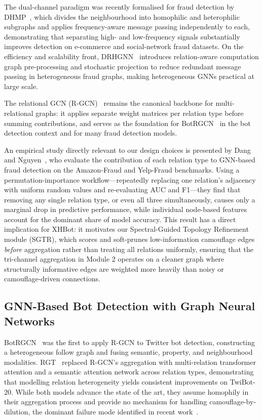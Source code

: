 The dual-channel paradigm was recently formalised for fraud detection by
DHMP~\cite{zhang2025dhmp}, which divides the neighbourhood into homophilic and
heterophilic subgraphs and applies frequency-aware message passing independently to
each, demonstrating that separating high- and low-frequency signals substantially
improves detection on e-commerce and social-network fraud datasets.
On the efficiency and scalability front, DRHGNN~\cite{li2025drhgnn} introduces
relation-aware computation graph pre-processing and stochastic projection to reduce
redundant message passing in heterogeneous fraud graphs, making heterogeneous GNNs
practical at large scale.

The relational GCN (R-GCN)~\cite{schlichtkrull2018rgcn} remains the canonical
backbone for multi-relational graphs: it applies separate weight matrices per
relation type before summing contributions, and serves as the foundation for
BotRGCN~\cite{feng2021botrgcn} in the bot detection context and for many fraud
detection models.

An empirical study directly relevant to our design choices is presented by
Dang and Nguyen~\cite{dang2022evaluating}, who evaluate the contribution of each relation type
to GNN-based fraud detection on the Amazon-Fraud and Yelp-Fraud benchmarks.
Using a permutation-importance workflow---repeatedly replacing one relation's
adjacency with uniform random values and re-evaluating AUC and F1---they find
that removing any single relation type, or even all three simultaneously, causes
only a marginal drop in predictive performance, while individual node-based
features account for the dominant share of model accuracy.
This result has a direct implication for XHBot: it motivates our
Spectral-Guided Topology Refinement module (SGTR), which scores and
soft-prunes low-information camouflage edges \emph{before} aggregation rather
than treating all relations uniformly, ensuring that the tri-channel aggregation
in Module 2 operates on a cleaner graph where structurally informative edges
are weighted more heavily than noisy or camouflage-driven connections.

\subsection{GNN-Based Bot Detection with Graph Neural Networks}

BotRGCN~\cite{feng2021botrgcn} was the first to apply R-GCN to Twitter bot
detection, constructing a heterogeneous follow graph and fusing semantic, property,
and neighbourhood modalities.
RGT~\cite{feng2022rgt} replaced R-GCN's aggregation with multi-relation transformer
attention and a semantic attention network across relation types, demonstrating that
modelling relation heterogeneity yields consistent improvements on TwiBot-20.
While both models advance the state of the art, they assume homophily in their
aggregation process and provide no mechanism for handling camouflage-by-dilution,
the dominant failure mode identified in recent work~\cite{li2026neighborsense,
liu2025hwgnn}.

